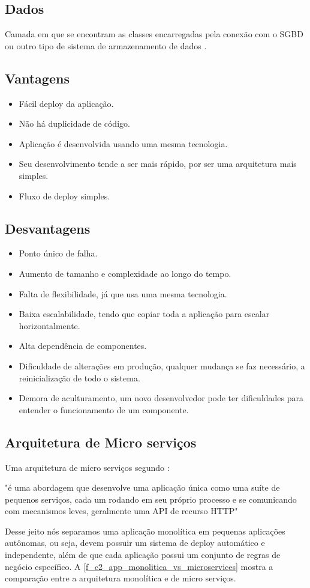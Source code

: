 \subsection*{Dados}
Camada em que se encontram as classes encarregadas pela conexão com o \ac{SGBD} ou outro tipo de sistema de armazenamento de dados \cite{monoVsMicro2017}.

\subsection*{Vantagens}
\begin{itemize}
	\item Fácil deploy da aplicação.
	\item Não há duplicidade de código.
	\item Aplicação é desenvolvida usando uma mesma tecnologia.
	\item Seu desenvolvimento tende a ser mais rápido, por ser uma arquitetura mais simples.
	\item Fluxo de deploy simples.
\end{itemize}

\subsection*{Desvantagens}
\begin{itemize}
	\item Ponto único de falha.
	\item Aumento de tamanho e complexidade ao longo do tempo.
	\item Falta de flexibilidade, já que usa uma mesma tecnologia.
	\item Baixa escalabilidade, tendo que copiar toda a aplicação para escalar horizontalmente.
	\item Alta dependência de componentes.
	\item Dificuldade de alterações em produção, qualquer mudança se faz necessário, a reinicialização de todo o sistema.
	\item Demora de aculturamento, um novo desenvolvedor pode ter dificuldades para entender o funcionamento de um componente.
\end{itemize}

\subsection{Arquitetura de Micro serviços}
Uma arquitetura de micro serviços segundo \cite{microservices2014}:  \begin{citacao}"é uma abordagem que desenvolve uma aplicação única como uma suíte de pequenos serviços, cada um rodando em seu próprio processo e se comunicando com mecanismos leves, geralmente uma \ac{API} de recurso \ac{HTTP}" \end{citacao} Desse jeito nós separamos uma aplicação monolítica em pequenas aplicações autônomas, ou seja, devem possuir um sistema de deploy automático e independente, além de que cada aplicação possui um conjunto de regras de negócio específico. A \autoref{f_c2_app_monolitica_vs_microservices} mostra a comparação entre a arquitetura monolítica e de micro serviços.



